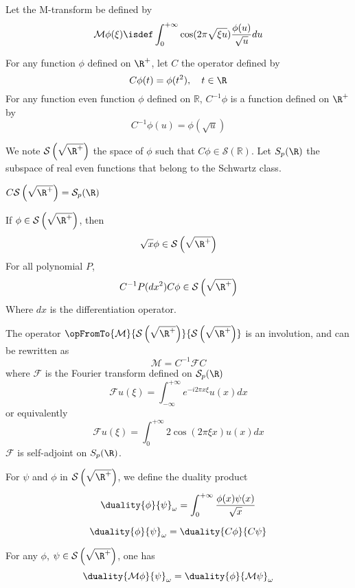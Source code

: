 \documentclass[]{article}
\begin{document}
	
\begin{Def}
	Let the M-transform be defined by
	\[\mathcal{M}\phi(\xi) \isdef \int_{0}^{+\infty} \cos(2\pi\sqrt{\xi u})\dfrac{\phi(u)}{\sqrt{u}}du\]
\end{Def}
\begin{Def}
	For any function $\phi$ defined on $\R^+$, let $C$ the operator defined by 
	\[C\phi(t) = \phi(t^2), \quad t \in  \R\]
	For any function even function $\phi$ defined on $\mathbb{R}$, $C^{-1}\phi$ is a function defined on $\R^+$ by 
	\[C^{-1}\phi(u) = \phi(\sqrt{u})\] 
\end{Def}
\begin{Def}
	We note $\mathcal{S}\left(\sqrt{\R^+}\right)$ the space of $\phi$ such that $C\phi \in \mathcal{S}(\mathbb{R})$. Let $S_p(\R)$ the subspace of real even functions that belong to the Schwartz class. 
\end{Def}
\begin{Prop}
	$C\mathcal{S}\left(\sqrt{\R^+}\right) = \mathcal{S}_p(\R)$
\end{Prop}
\begin{Prop}
	If $\phi \in \mathcal{S}\left(\sqrt{\R^+}\right)$, then 
	\[\sqrt{x}\phi \in \mathcal{S}\left(\sqrt{\R^+}\right)\]
	For all polynomial $P$, 
	\[C^{-1}P(dx^2)C \phi \in \mathcal{S}\left(\sqrt{\R^+}\right)\]
	Where $dx$ is the differentiation operator. 
\end{Prop}
\begin{Prop}
	The operator $\opFromTo{\mathcal{M}}{\mathcal{S}\left(\sqrt{\R^+}\right)}{\mathcal{S}\left(\sqrt{\R^+}\right)}$ is an involution, and can be rewritten as 
	\[\mathcal{M} = C^{-1}\mathcal{F}C\]
	where $\mathcal{F}$ is the Fourier transform defined on $\mathcal{S}_p(\R)$
	\[\mathcal{F}u(\xi) = \int_{-\infty}^{+\infty}e^{-i2\pi x \xi}u(x)dx\]
	or equivalently
	\[\mathcal{F}u(\xi) = \int_{0}^{+\infty}2\cos(2\pi\xi x)u(x)dx\]
	$\mathcal{F}$ is self-adjoint on $S_p(\R)$. 
\end{Prop}
\begin{Def}For $\psi$ and $\phi$ in $\mathcal{S}\left(\sqrt{\R^+}\right)$, we define the duality product 
	\[\duality{\phi}{\psi}_{\omega}= \int_{0}^{+\infty}\dfrac{\phi(x) \psi(x)}{\sqrt{x}}\]
\end{Def}
\begin{Prop}
	\[\duality{\phi}{\psi}_{\omega} = \duality{C\phi}{C\psi}\]
\end{Prop}
\begin{Prop}
	For any $\phi$, $\psi \in \mathcal{S}\left(\sqrt{\R^+}\right)$, one has
	\[\duality{\mathcal{M}\phi}{\psi}_{\omega} = \duality{\phi}{\mathcal{M}\psi}_{\omega}\]
\end{Prop}
\end{document}
